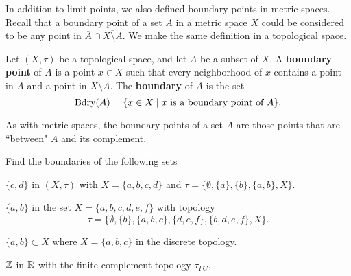 
In addition to limit points, we also defined boundary points in metric spaces. Recall that a boundary point of a set $A$ in a metric space $X$ could be considered to be any point in $\overline{A} \cap \overline{X \setminus A}$. We make the same definition in a topological space. 

\begin{definition} Let $(X, \tau)$ be a topological space, and let $A$ be a subset of $X$. A \textbf{boundary point} of $A$ is a point $x \in X$ such that every neighborhood of $x$ contains a point in $A$ and a point in $X \setminus A$. The \textbf{boundary} of $A$ is the set 
\[\text{Bdry}(A) = \{x \in X \mid x \text{ is a boundary point of } A\}.\]
\end{definition}

As with metric spaces, the boundary points of a set $A$ are those points that are ``between" $A$ and its complement. 

\begin{activity} \label{act:TS_bl_examples} Find the boundaries of the following sets
\ba
\item $\{c,d\}$ in $(X, \tau)$ with $X= \{a,b,c,d\}$ and $\tau = \{\emptyset, \{a\}, \{b\}, \{a,b\}, X \}$.

\item $\{a,b\}$ in the set $X= \{a,b,c,d,e,f\}$ with topology 
\[\tau= \{\emptyset,\{b\}, \{a,b,c\},\{d,e,f\},\{b,d,e,f\}, X\}.\] 

\item $\{a,b\} \subset X$ where $X = \{a,b,c\}$ in the discrete topology.

\item $\mathbb{Z}$ in $\mathbb{R}$ with the finite complement topology $\tau_{FC}$. 

\ea

\end{activity}

